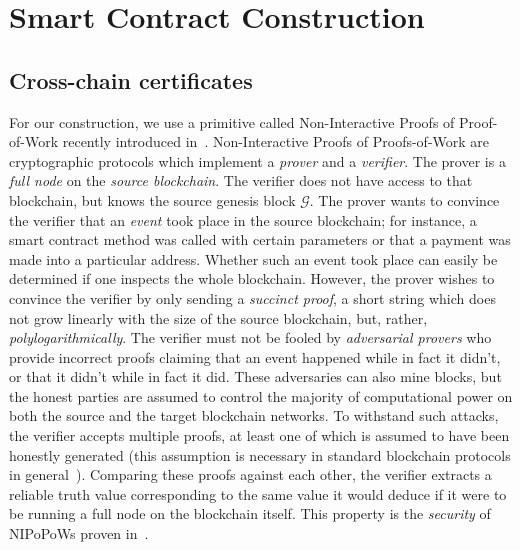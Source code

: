 \section{Smart Contract Construction}


\subsection*{Cross-chain certificates}
For our construction, we use a primitive called Non-Interactive Proofs of
Proof-of-Work recently introduced in~\cite{nipopows}.
Non-Interactive Proofs of Proofs-of-Work are cryptographic protocols which
implement a \emph{prover} and a \emph{verifier}. The prover is a \emph{full
node} on the \emph{source blockchain}. The verifier does not have access to
that blockchain, but knows the source genesis block $\mathcal{G}$. The prover
wants to convince the verifier that an \emph{event} took place in the source
blockchain; for instance, a smart contract method was called with certain
parameters or that a payment was made into a particular address. Whether such an
event took place can easily be determined if one inspects the whole blockchain.
However, the prover wishes to convince the verifier by only sending a
\emph{succinct proof}, a short string which does not grow linearly  with the
size of the source blockchain, but, rather, \emph{polylogarithmically}. The
verifier must not be fooled by \emph{adversarial provers} who provide incorrect
proofs claiming that an event happened while in fact it didn't, or that it
didn't while in fact it did. These adversaries can also mine blocks, but the
honest parties are assumed to control the majority of computational power on
both the source and the target blockchain networks. To withstand such attacks,
the verifier accepts multiple proofs, at least one of which is assumed to have
been honestly generated (this assumption is necessary in standard blockchain
protocols in general~\cite{eclipse,eclipse-ethereum}). Comparing these
proofs against each other, the verifier extracts a reliable truth value
corresponding to the same value it would deduce if it were to be running a full
node on the blockchain itself. This property is the \emph{security} of NIPoPoWs
proven in~\cite{nipopows}.

